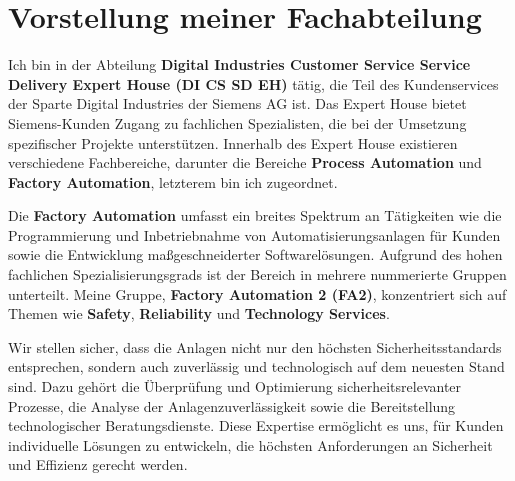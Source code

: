 \chapter{Vorstellung meiner Fachabteilung}\label{ch:data}

\label{sec:Vorstellung meiner Fachabteilung}

Ich bin in der Abteilung \textbf{Digital Industries Customer Service Service Delivery Expert House (DI CS SD EH)} tätig, die Teil des 
Kundenservices der Sparte Digital Industries der Siemens AG ist. Das Expert House bietet Siemens-Kunden Zugang zu fachlichen Spezialisten, 
die bei der Umsetzung spezifischer Projekte unterstützen. Innerhalb des Expert House existieren verschiedene Fachbereiche, darunter die 
Bereiche \textbf{Process Automation} und \textbf{Factory Automation}, letzterem bin ich zugeordnet.

Die \textbf{Factory Automation} umfasst ein breites Spektrum an Tätigkeiten wie die Programmierung und Inbetriebnahme von Automatisierungsanlagen 
für Kunden sowie die Entwicklung maßgeschneiderter Softwarelösungen. Aufgrund des hohen fachlichen Spezialisierungsgrads ist der Bereich in 
mehrere nummerierte Gruppen unterteilt. Meine Gruppe, \textbf{Factory Automation 2 (FA2)}, konzentriert sich auf Themen wie 
\textbf{Safety}, \textbf{Reliability} und \textbf{Technology Services}. 

Wir stellen sicher, dass die Anlagen nicht nur den höchsten Sicherheitsstandards entsprechen, sondern auch zuverlässig und 
technologisch auf dem neuesten Stand sind. Dazu gehört die Überprüfung und Optimierung sicherheitsrelevanter Prozesse, die Analyse der 
Anlagenzuverlässigkeit sowie die Bereitstellung technologischer Beratungsdienste. Diese Expertise ermöglicht es uns, für Kunden individuelle 
Lösungen zu entwickeln, die höchsten Anforderungen an Sicherheit und Effizienz gerecht werden.


